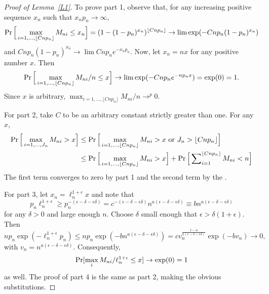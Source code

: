 \documentclass[11pt]{article}
\begin{document}
\begin{proof}[Proof of Lemma~\ref{L1}]
  To prove part 1, observe that, for any increasing positive sequence
  $x_n$ such that $x_n p_n \to \infty$,
  \begin{equation*}
    \operatorname{Pr}\Big[\max_{i=1,\dots, \lfloor C n p_n \rfloor} M_{ni} \leq x_n\Big] =
    (1 - (1 - p_n)^{x_n})^{\lfloor C n p_n \rfloor} \to \lim \exp(-C n p_n (1 - p_n)^{x_n})
  \end{equation*}
  and $C n p_n (1 - p_n)^{x_n} \to \lim C n p_n e^{-x_n p_n}$. Now, let
  $x_n = n x$ for any positive number $x$.  Then
  \begin{equation*}
    \operatorname{Pr}\Big[\max_{i=1,\dots,\lfloor C n p_n \rfloor} M_{ni}/n \leq x \Big] \to
    \lim \exp(-C n p_n e^{-n p_n x}) =
    \exp(0) = 1.
  \end{equation*}
  Since $x$ is arbitrary, $\max_{i=1,\dots,\lfloor C n p_n \rfloor} M_{ni} / n \to^p 0$.

  For part 2, take $C$ to be an arbitrary constant strictly greater
  than one. For any $x$,
  \begin{align*}
    \operatorname{Pr}\Big[\max_{i=1,\dots,J_n} M_{ni} > x\Big] & \leq
    \operatorname{Pr}\Big[\max_{i=1,\dots,\lfloor C n p_n \rfloor} M_{ni} > x
    \text{\ or\ } J_n > \lfloor C n p_n \rfloor\Big] \\
    & \leq \operatorname{Pr}\Big[\max_{i=1,\dots,\lfloor C n p_n \rfloor} M_{ni} > x\Big]
    + \operatorname{Pr}\Big[\sum\nolimits_{i=1}^{\lfloor C n
      p_n \rfloor} M_{ni} < n \Big]
  \end{align*}
  The first term converges to zero by part 1 and the second term by
  the \lln.

  For part 3, let $x_n = \ell_n^{1 + \epsilon} x$ and note that
  \begin{equation*}
    p_n \ell_n^{1+\epsilon} \geq p_n^{-(\epsilon-\delta-\epsilon\delta)} =
    c^{-(\epsilon-\delta-\epsilon\delta)}
    n^{a(\epsilon-\delta-\epsilon\delta)} \equiv b n^{a(\epsilon
      - \delta - \epsilon\delta)}
  \end{equation*}
  for any $\delta > 0$ and large enough $n$.  Choose $\delta$ small
  enough that $\epsilon > \delta(1 +\epsilon)$. Then
  \begin{equation*}
    n p_n \exp(-\ell_n^{1+\epsilon} p_n) \leq n p_n
    \exp(-b n^{a(\epsilon -
      \delta - \epsilon\delta)}) = c
    v_n^{\frac{1-a}{a(\epsilon-\delta-\epsilon\delta)}}
    \exp(-b v_n) \to 0,
  \end{equation*}
  with $v_n = n^{a(\epsilon-\delta-\epsilon\delta)}$.  Consequently,
  \begin{equation*}
    \operatorname{Pr}[\max_i M_{ni}/\ell_n^{1+\epsilon} \leq x ] \to \exp(0) = 1
  \end{equation*}
  as well.
  The proof of part 4 is the same as part 2, making the obvious
  substitutions.


\end{proof}
\end{document}
